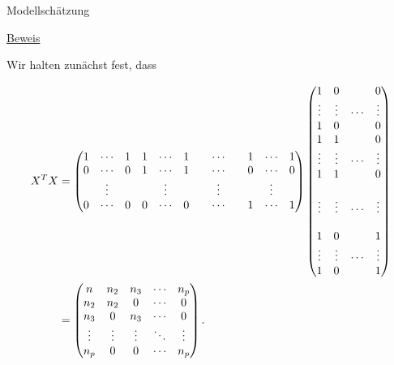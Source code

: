 \documentclass[
  8pt,
  ignorenonframetext,
]{beamer}
\begin{document}
\begin{frame}{Modellschätzung}
\protect\hypertarget{modellschuxe4tzung-1}{}
\footnotesize
\vspace{2mm}

\underline{Beweis}

Wir halten zunächst fest, dass

\tiny

\begin{align*}
\begin{split}
X^T X
& =
\setcounter{MaxMatrixCols}{20}
\begin{pmatrix}
1 & \cdots & 1 & 1 & \cdots & 1 & & \cdots & & 1 & \cdots & 1   \\
0 & \cdots & 0 & 1 & \cdots & 1 & & \cdots & & 0 & \cdots & 0   \\
  & \vdots &   &   & \vdots &   & & \vdots & &   & \vdots &     \\
0 & \cdots & 0 & 0 & \cdots & 0 & & \cdots & & 1 & \cdots & 1   \\
\end{pmatrix}
\begin{pmatrix}
1         &     0           &             &     0       \\
\vdots  &   \vdots  &   \cdots  &   \vdots  \\
1       &   0           &               &   0       \\
1         &     1           &               &   0       \\
\vdots  &   \vdots  &   \cdots  &   \vdots  \\
1         &     1         &             &   0       \\
            &               &               &           \\
\vdots  &   \vdots  &   \cdots  &   \vdots  \\
            &               &               &           \\
1       &   0           &               &   1       \\
\vdots  &   \vdots  &   \cdots  &   \vdots  \\
1         &     0         &             &   1       \\
\end{pmatrix} \\
& =
\begin{pmatrix}
n       & n_2       & n_3       &   \cdots  & n_p       \\
n_2     & n_2       & 0         &   \cdots  & 0         \\
n_3     & 0         & n_3       &   \cdots  & 0         \\
\vdots  & \vdots    & \vdots    &   \ddots  & \vdots    \\
n_p     & 0         & 0         &   \cdots  & n_p       \\
\end{pmatrix}.
\end{split}
\end{align*}
\end{frame}
\end{document}
